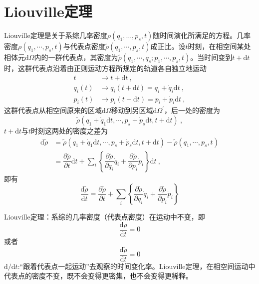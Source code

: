\documentclass[12pt,a4paper]{article}
\newcommand{\dif}{\mathrm{d}}
\begin{document}
\section{Liouville定理}
Liouville定理是关于系综几率密度$\rho(q_1, \dots ,p_s,t)$随时间演化所满足的方程。几率密度$\rho(q_1, \cdots, p_s, t)$与代表点密度$\tilde{\rho}(q_1, \cdots, p_s, t)$成正比。设$t$时刻，在相空间某处相体元$\dif \Omega$内的一群代表点，其密度为$\tilde{\rho}(q_1, \cdots, q_s; p_1, \cdots, p_s, t)$。当时间变到$t+\dif t$时，这群代表点沿着由正则运动方程所规定的轨道各自独立地运动
\begin{align}
t &\longrightarrow t +\dif t ~, \\
q_i(t) &\longrightarrow q_i(t +\dif t) = q_i +\dot{q}_i \dif t ~, \\
p_i(t) &\longrightarrow p_i(t +\dif t) = p_i +\dot{p}_i \dif t ~, 
\end{align}
这群代表点从相空间原来的区域$\dif \Omega$移动到另区域$\dif \Omega^\prime$，后一处的密度为
\begin{equation*}
\tilde{\rho}(q_1 +\dot{q}_1 \dif t, \cdots, p_s +\dot{p}_s \dif t,  t+\dif t) ~,
\end{equation*}
$t +\dif t$与$t$时刻这两处的密度之差为
\begin{align}
\nonumber \dif \tilde{\rho} &= \tilde{\rho}(q_1 +\dot{q}_1 \dif t, \cdots, p_s +\dot{p}_s \dif t,  t+\dif t) -\tilde{\rho}(q_1, \cdots, p_s,  t) \\
&= \dfrac{\partial \tilde{\rho}}{\partial t} \dif t + \sum_i \left\{\dfrac{\partial \tilde{\rho}}{\partial q_i} \dot{q}_i +\dfrac{\partial \tilde{\rho}}{\partial p_i} \dot{p}_i  \right\} \dif t ~,
\end{align}
即有
\begin{equation}
 \dfrac{\dif \tilde{\rho}}{\dif t} = \dfrac{\partial \tilde{\rho}}{\partial t} + \sum_i \left\{\dfrac{\partial \tilde{\rho}}{\partial q_i} \dot{q}_i +\dfrac{\partial \tilde{\rho}}{\partial p_i} \dot{p}_i  \right\}
\end{equation}

Liouville定理：系综的几率密度（代表点密度）在运动中不变，即
\begin{equation}
\frac{\dif \rho}{\dif t} = 0
\end{equation}
或者 
\begin{equation}
\frac{\dif \tilde{\rho}}{\dif t} = 0
\end{equation}
$\dif /\dif t$:“跟着代表点一起运动”去观察的时间变化率。Liouville定理，在相空间运动中代表点的密度不变，既不会变得更密集，也不会变得更稀释。
\end{document}
